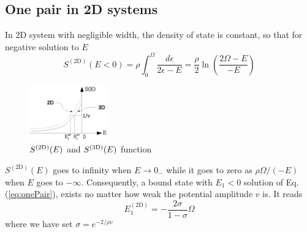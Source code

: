 \documentclass[3p,twocolumn]{elsarticle}
\begin{document}
\subsection{One pair in 2D systems}
In 2D system with negligible width, the density of state is constant, so that for negative solution to $E$ 
\begin{equation}
S^{(\text{2D})}(E<0)=\rho\int_0^{\Omega}\frac{d\epsilon}{2\epsilon-E}=\frac{\rho}{2}\ln\left(\frac{2\Omega-E}{-E}\right)
\label{eq:s1pair}
\end{equation}
\begin{figure}[htbp]
	\centering
		\includegraphics[width=0.30\textwidth]{OnePair.eps}
	\caption{$S^{{\text{(2D)}}}(E)$ and $S^{{{\text{(3D)}}}}(E)$ function}
	\label{fig:OnePair}
\end{figure}
$S^{(\text{2D})}(E)$ goes to infinity when $E\rightarrow{}0_{-}$ while it goes to zero as $\rho\Omega/(-E)$ when $E$ goes to $-\infty$. Consequently, a bound state with $E_1<0$ solution of Eq. (\ref{eq:onePair}),  exists no matter how weak the potential amplitude $v$ is. It reads
\begin{equation}
E_1^{(\text{2D})}=-\frac{2\sigma}{1-\sigma}\Omega
\label{eq:}
\end{equation}
where we have set $\sigma=e^{-2/\rho{v}}$
\end{document}
